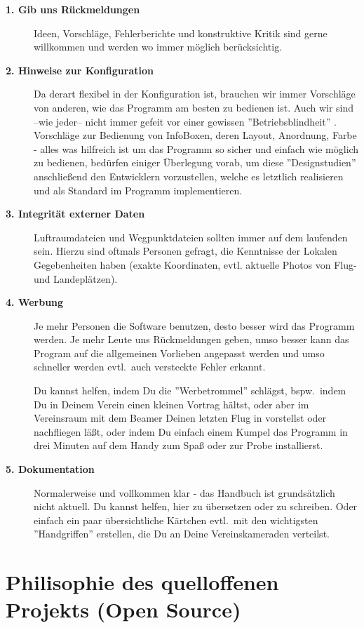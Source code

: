 \begin{description}
\item[{\bf 1. Gib uns Rückmeldungen}] Ideen, Vorschläge, Fehlerberichte und konstruktive Kritik sind gerne willkommen und werden
wo immer möglich berücksichtig.
\item[{\bf2. Hinweise zur Konfiguration}] Da \xc derart flexibel in der Konfiguration ist, brauchen wir immer Vorschläge von anderen, wie
das Programm am besten zu bedienen ist. Auch wir sind --wie jeder-- nicht immer gefeit vor einer gewissen ''Betriebsblindheit'' .
Vorschläge zur Bedienung von InfoBoxen, deren Layout, Anordnung, Farbe - alles was hilfreich ist um das Programm so sicher
und einfach wie möglich zu bedienen, bedürfen einiger Überlegung vorab, um diese ''Designstudien'' anschließend den Entwicklern
vorzustellen, welche es letztlich realisieren und als Standard im Programm implementieren.
\item[{\bf3. Integrität externer Daten}] Luftraumdateien und Wegpunktdateien sollten immer auf dem laufenden sein.
Hierzu sind oftmals Personen gefragt, die Kenntnisse der Lokalen Gegebenheiten haben (exakte Koordinaten, evtl. aktuelle Photos von Flug- und Landeplätzen).
\item[{\bf4. Werbung}]  Je mehr Personen die Software benutzen, desto besser wird das Programm werden. Je mehr Leute uns Rückmeldungen geben, umso
besser kann das Program auf die allgemeinen Vorlieben angepasst werden und umso schneller werden evtl.\ auch versteckte Fehler erkannt.

Du kannst helfen, indem Du die ''Werbetrommel'' schlägst, bspw.\ indem Du in Deinem Verein einen kleinen Vortrag hältst, oder aber im Vereinsraum mit
dem Beamer Deinen letzten Flug in \xc vorstellst oder nachfliegen läßt, oder indem Du einfach einem Kumpel das Programm in drei Minuten auf 
dem Handy zum Spaß oder zur Probe installierst.
\item[{\bf5. Dokumentation}]  Normalerweise und vollkommen klar - das Handbuch ist grundsätzlich nicht aktuell. Du kannst helfen, hier zu übersetzen oder zu 
schreiben. Oder einfach ein paar übersichtliche Kärtchen evtl.\ mit den wichtigsten ''Handgriffen'' erstellen, die Du an Deine Vereinskameraden 
verteilst.
\end{description}


\section{Philisophie des quelloffenen Projekts (Open Source)}


